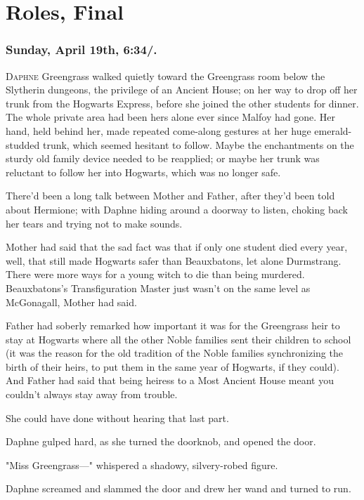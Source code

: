 \chapter{Roles, Final}

\subsection{Sunday, April 19th, 6:34\PM/.}

\lettrine{D}{aphne} Greengrass walked quietly toward the Greengrass room below the Slytherin
dungeons, the privilege of an Ancient House; on her way to drop off her trunk
from the Hogwarts Express, before she joined the other students for dinner. The
whole private area had been hers alone ever since Malfoy had gone. Her hand,
held behind her, made repeated come-along gestures at her huge emerald-studded
trunk, which seemed hesitant to follow. Maybe the enchantments on the sturdy
old family device needed to be reapplied; or maybe her trunk was reluctant to
follow her into Hogwarts, which was no longer safe.

There'd been a long talk between Mother and Father, after they'd been told
about Hermione; with Daphne hiding around a doorway to listen, choking back her
tears and trying not to make sounds.

Mother had said that the sad fact was that if only one student died every year,
well, that still made Hogwarts safer than Beauxbatons, let alone Durmstrang.
There were more ways for a young witch to die than being murdered.
Beauxbatons's Transfiguration Master just wasn't on the same level as
McGonagall, Mother had said.

Father had soberly remarked how important it was for the Greengrass heir to
stay at Hogwarts where all the other Noble families sent their children to
school (it was the reason for the old tradition of the Noble families
synchronizing the birth of their heirs, to put them in the same year of
Hogwarts, if they could). And Father had said that being heiress to a Most
Ancient House meant you couldn't always stay away from trouble.

She could have done without hearing that last part.

Daphne gulped hard, as she turned the doorknob, and opened the door.

"Miss Greengrass\mbox{---}" whispered a shadowy, silvery-robed figure.

Daphne screamed and slammed the door and drew her wand and turned to run.

